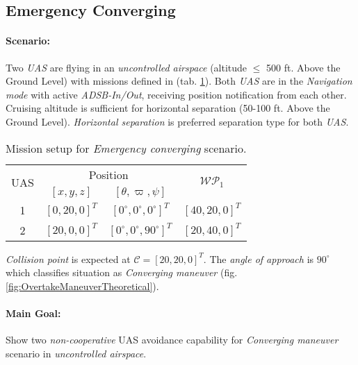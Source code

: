 \subsection{Emergency Converging}\label{s:testEmergencyConverging}

\paragraph{Scenario:} Two \emph{UAS} are flying in an \emph{uncontrolled airspace} (altitude $\le$ 500 ft. Above the Ground Level) with missions defined in (tab. \ref{tab:missionSetupEmergencyConvergingScenario}). Both \emph{UAS} are in the \emph{Navigation mode} with active \emph{ADSB-In/Out}, receiving position notification from each other. Cruising altitude is sufficient for horizontal separation (50-100 ft. Above the Ground Level). \emph{Horizontal separation} is preferred separation type for both \emph{UAS}.

\begin{table}[H]
    \centering
    \begin{tabular}{c||c|c||c}
        \multirow{2}{*}{UAS} &\multicolumn{2}{c||}{Position} & \multirow{2}{*}{$\mathscr{WP}_1$} \\\cline{2-3}
          & $[x,y,z]$           & $[\theta,\varpi,\psi]$           & \\\hline\hline
        1 & $[0,20,0]^T $       & $[0^\circ,0^\circ,0^\circ]^T$    & $[40,20,0]^T$\\\hline 
        2 & $[20,0,0]^T $       & $[0^\circ,0^\circ,90^\circ]^T$  & $[20,40,0]^T$\\ 
    \end{tabular}
    \caption{Mission setup for \emph{Emergency converging} scenario.}
    \label{tab:missionSetupEmergencyConvergingScenario}
\end{table}

\begin{note}
\emph{Collision point} is expected at $\mathscr{C} = [20,20,0]^T$. The \emph{angle of approach} is $90^{\circ}$ which classifies situation as \emph{Converging maneuver} (fig. \ref{fig:OvertakeManeuverTheoretical}).
\end{note}

\paragraph{Main Goal:} Show two \emph{non-cooperative} UAS avoidance capability for \emph{Converging maneuver} scenario in \emph{uncontrolled airspace}.


